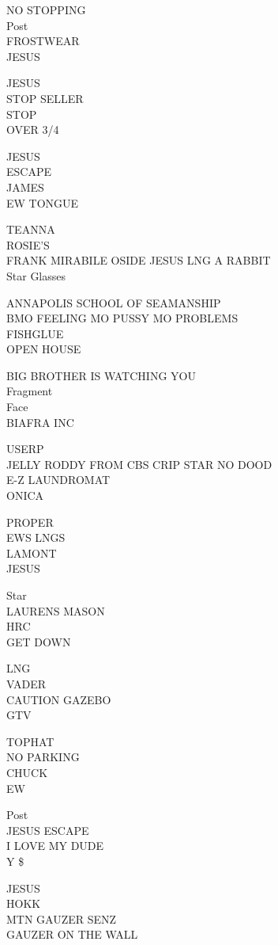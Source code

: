 \documentclass[10pt,letterpaper]{article}
\begin{document}
NO STOPPING\\
Post\\
FROSTWEAR\\
JESUS

JESUS\\
STOP SELLER\\
STOP\\
OVER 3/4

JESUS\\
ESCAPE\\
JAMES\\
EW TONGUE

TEANNA\\
ROSIE'S\\
FRANK MIRABILE OSIDE JESUS LNG A RABBIT\\
Star Glasses

ANNAPOLIS SCHOOL OF SEAMANSHIP\\
BMO FEELING MO PUSSY MO PROBLEMS\\
FISHGLUE\\
OPEN HOUSE

BIG BROTHER IS WATCHING YOU\\
Fragment\\
Face\\
BIAFRA INC

USERP\\
JELLY RODDY FROM CBS CRIP STAR NO DOOD\\
E{-}Z LAUNDROMAT\\
ONICA

PROPER\\
EWS LNGS\\
LAMONT\\
JESUS

Star\\
LAURENS MASON\\
HRC\\
GET DOWN

LNG\\
VADER\\
CAUTION GAZEBO\\
GTV

TOPHAT\\
NO PARKING\\
CHUCK\\
EW

Post\\
JESUS ESCAPE\\
I LOVE MY DUDE\\
Y \$

JESUS\\
HOKK\\
MTN GAUZER SENZ\\
GAUZER ON THE WALL
\end{document}
